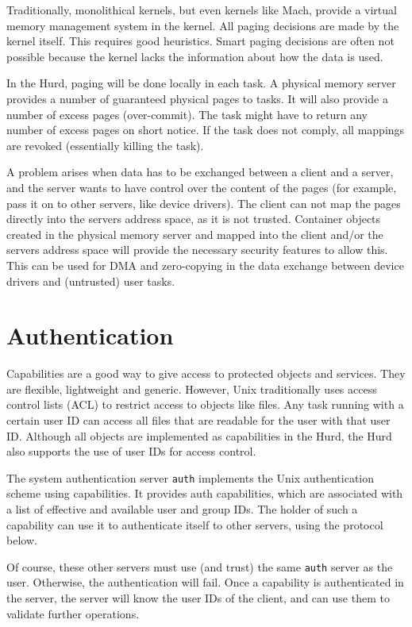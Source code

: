 \documentclass[9pt,a4paper]{extarticle}
\begin{document}
Traditionally, monolithical kernels, but even kernels like Mach,
provide a virtual memory management system in the kernel.  All paging
decisions are made by the kernel itself.  This requires good
heuristics.  Smart paging decisions are often not possible because the
kernel lacks the information about how the data is used.

In the Hurd, paging will be done locally in each task.  A physical
memory server provides a number of guaranteed physical pages to tasks.
It will also provide a number of excess pages (over-commit).  The task
might have to return any number of excess pages on short notice.  If
the task does not comply, all mappings are revoked (essentially
killing the task).

A problem arises when data has to be exchanged between a client and a
server, and the server wants to have control over the content of the
pages (for example, pass it on to other servers, like device drivers).
The client can not map the pages directly into the servers address
space, as it is not trusted.  Container objects created in the
physical memory server and mapped into the client and/or the servers
address space will provide the necessary security features to allow
this.  This can be used for DMA and zero-copying in the data exchange
between device drivers and (untrusted) user tasks.


\section{Authentication}
\label{auth}

Capabilities are a good way to give access to protected objects and
services.  They are flexible, lightweight and generic.  However, Unix
traditionally uses access control lists (ACL) to restrict access to
objects like files.  Any task running with a certain user ID can
access all files that are readable for the user with that user ID.
Although all objects are implemented as capabilities in the Hurd, the
Hurd also supports the use of user IDs for access control.

The system authentication server \texttt{auth} implements the Unix
authentication scheme using capabilities.  It provides auth
capabilities, which are associated with a list of effective and
available user and group IDs.  The holder of such a capability can use
it to authenticate itself to other servers, using the protocol below.

Of course, these other servers must use (and trust) the same
\texttt{auth} server as the user.  Otherwise, the authentication will
fail.  Once a capability is authenticated in the server, the server
will know the user IDs of the client, and can use them to validate
further operations.
\end{document}
